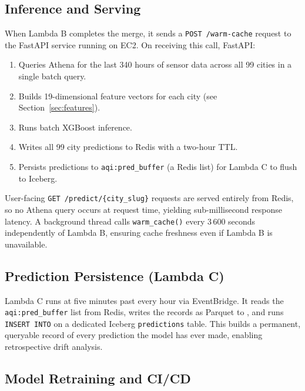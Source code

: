 \documentclass[sigconf, nonacm]{acmart}
\begin{document}
\subsection{Inference and Serving}

When Lambda B completes the merge, it sends a
\texttt{POST /warm-cache} request to the FastAPI service
running on EC2.  On receiving this call, FastAPI:

\begin{enumerate}
  \item Queries Athena for the last 340 hours of sensor
        data across all 99 cities in a single batch query.
  \item Builds 19-dimensional feature vectors for each city
        (see Section~\ref{sec:features}).
  \item Runs batch XGBoost inference.
  \item Writes all 99 city predictions to Redis with a
        two-hour TTL.
  \item Persists predictions to \texttt{aqi:pred\_buffer}
        (a Redis list) for Lambda C to flush to Iceberg.
\end{enumerate}

User-facing \texttt{GET /predict/\{city\_slug\}} requests
are served entirely from Redis, so no Athena query occurs
at request time, yielding sub-millisecond response latency.
A background thread calls \texttt{warm\_cache()} every
3\,600 seconds independently of Lambda B, ensuring cache
freshness even if Lambda B is unavailable.

\subsection{Prediction Persistence (Lambda C)}

Lambda C runs at five minutes past every hour via
EventBridge.  It reads the \texttt{aqi:pred\_buffer} list
from Redis, writes the records as Parquet to
,
and runs \texttt{INSERT INTO} on a dedicated Iceberg
\texttt{predictions} table.  This builds a permanent,
queryable record of every prediction the model has ever
made, enabling retrospective drift analysis.

\subsection{Model Retraining and CI/CD}
\end{document}
